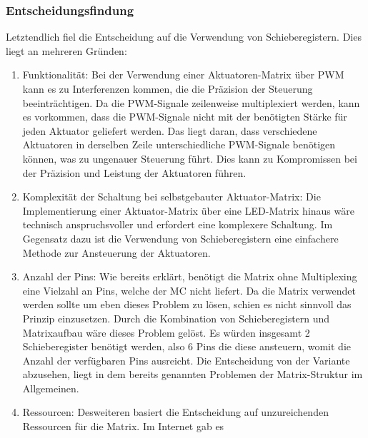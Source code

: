 \subsubsection{Entscheidungsfindung}
Letztendlich fiel die Entscheidung auf die Verwendung von Schieberegistern. Dies liegt an mehreren Gründen:
\begin{enumerate}
	\item Funktionalität: Bei der Verwendung einer Aktuatoren-Matrix über \ac{PWM}
	kann es zu Interferenzen kommen, die die Präzision der Steuerung beeinträchtigen. Da die \ac{PWM}-Signale zeilenweise
	multiplexiert werden, kann es vorkommen, dass die \ac{PWM}-Signale nicht mit der benötigten Stärke für jeden Aktuator geliefert
	werden. Das liegt daran, dass verschiedene Aktuatoren in derselben Zeile unterschiedliche \ac{PWM}-Signale benötigen können,
	was zu ungenauer Steuerung führt. Dies kann zu Kompromissen bei der Präzision und Leistung der Aktuatoren führen.
	\item Komplexität der Schaltung bei selbstgebauter Aktuator-Matrix: Die Implementierung einer Aktuator-Matrix über eine
	LED-Matrix hinaus wäre technisch anspruchsvoller und erfordert eine komplexere Schaltung. Im Gegensatz dazu ist die
	Verwendung von Schieberegistern eine einfachere Methode zur Ansteuerung der Aktuatoren.
	\item Anzahl der Pins: Wie bereits erklärt, benötigt die Matrix ohne Multiplexing eine Vielzahl an Pins, welche der \ac{MC} %
	nicht liefert. Da die Matrix verwendet werden sollte um eben dieses Problem zu lösen, schien es nicht sinnvoll
	das Prinzip einzusetzen. Durch die Kombination von Schieberegistern und Matrixaufbau wäre dieses Problem gelöst.
	Es würden insgesamt 2 Schieberegister benötigt werden, also 6 Pins die diese ansteuern, womit die Anzahl der verfügbaren
	Pins ausreicht. Die Entscheidung von der Variante abzusehen, liegt in dem bereits genannten Problemen der Matrix-Struktur im Allgemeinen.
	\item Ressourcen: Desweiteren basiert die Entscheidung auf unzureichenden Ressourcen für die Matrix. Im Internet gab es

\end{enumerate}
